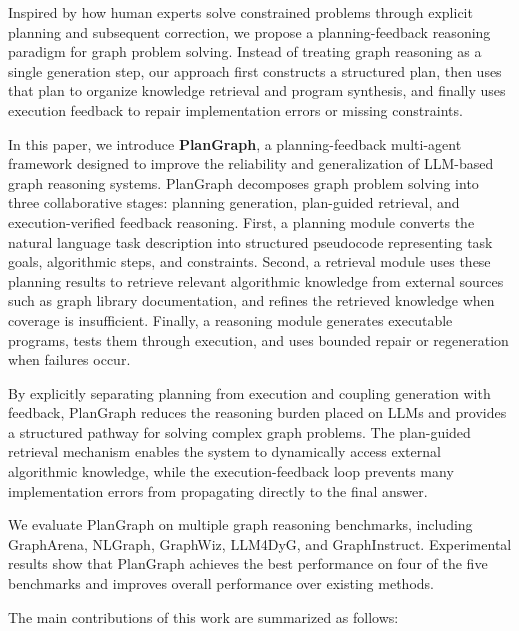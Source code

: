 \documentclass[sigconf,review,anonymous]{acmart}
\begin{document}
Inspired by how human experts solve constrained problems through explicit planning and subsequent correction, we propose a planning-feedback reasoning paradigm for graph problem solving. Instead of treating graph reasoning as a single generation step, our approach first constructs a structured plan, then uses that plan to organize knowledge retrieval and program synthesis, and finally uses execution feedback to repair implementation errors or missing constraints.

In this paper, we introduce \textbf{PlanGraph}, a planning-feedback multi-agent framework designed to improve the reliability and generalization of LLM-based graph reasoning systems. PlanGraph decomposes graph problem solving into three collaborative stages: planning generation, plan-guided retrieval, and execution-verified feedback reasoning. First, a planning module converts the natural language task description into structured pseudocode representing task goals, algorithmic steps, and constraints. Second, a retrieval module uses these planning results to retrieve relevant algorithmic knowledge from external sources such as graph library documentation, and refines the retrieved knowledge when coverage is insufficient. Finally, a reasoning module generates executable programs, tests them through execution, and uses bounded repair or regeneration when failures occur.

By explicitly separating planning from execution and coupling generation with feedback, PlanGraph reduces the reasoning burden placed on LLMs and provides a structured pathway for solving complex graph problems. The plan-guided retrieval mechanism enables the system to dynamically access external algorithmic knowledge, while the execution-feedback loop prevents many implementation errors from propagating directly to the final answer.

We evaluate PlanGraph on multiple graph reasoning benchmarks, including GraphArena, NLGraph, GraphWiz, LLM4DyG, and GraphInstruct. Experimental results show that PlanGraph achieves the best performance on four of the five benchmarks and improves overall performance over existing methods.

The main contributions of this work are summarized as follows:
\end{document}

